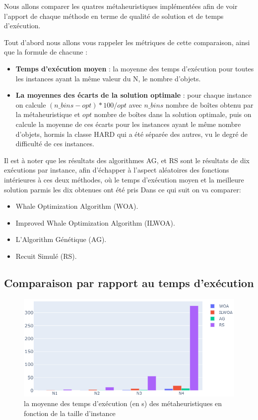 \documentclass[12pt]{article}
\begin{document}
    Nous allons comparer les quatres métaheuristiques implémentées afin de voir l’apport de chaque méthode en terme de qualité de solution et de temps d'exécution.

    Tout d’abord nous allons vous rappeler les métriques de cette comparaison, ainsi que la formule de chacune :
    \begin{itemize}
        \item \textbf{Temps d'exécution moyen} : la moyenne des temps d'exécution pour toutes les instances ayant la même valeur du N, le nombre d’objets.
        \item \textbf{La moyennes des écarts de la solution optimale} : pour chaque instance on calcule 
        \((n\_bins - opt)*100/opt\) avec \(n\_bins\) nombre de boîtes obtenu par la métaheuristique et \(opt\) nombre de boîtes dans la solution optimale, puis on calcule la moyenne de ces écarts pour les instances ayant le même nombre d’objets, hormis la classe HARD qui a été séparée des autres, vu le degré de difficulté de ces instances. 
    \end{itemize}

    Il est à noter que les résultats des algorithmes AG, et RS sont le résultats de dix exécutions par instance, afin d’échapper à l’aspect aléatoires des fonctions intérieures à ces deux méthodes, où le temps d'exécution moyen et la meilleure solution parmis les dix obtenues ont été pris
    Dans ce qui suit on va comparer:
    \begin{itemize}
        \item Whale Optimization Algorithm (WOA).
        \item Improved Whale Optimization Algorithm (ILWOA).
        \item L’Algorithm Génétique (AG).
        \item Recuit Simulé (RS).
    \end{itemize} 
    \subsection{Comparaison par rapport au temps d'exécution}
        \begin{figure}[H]
            \includegraphics[width=\linewidth]{../figures/mh_texec.png}
            \caption{la moyenne des temps d'exécution (en s) des métaheuristiques en fonction de la taille d'instance}
        \end{figure}
\end{document}
